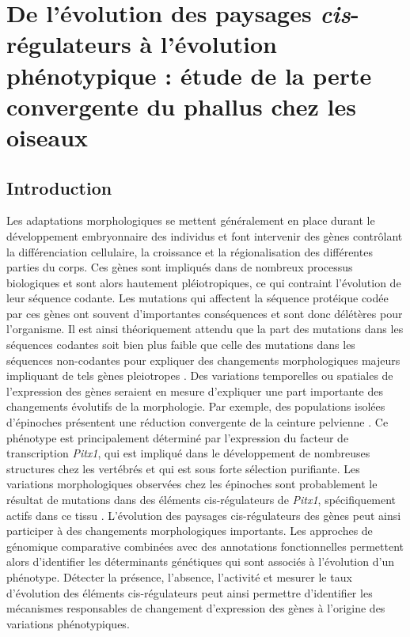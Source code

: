\chapter{De l’évolution des paysages \textit{cis}-régulateurs à l’évolution phénotypique : étude de la perte convergente du phallus chez les oiseaux}
{\hypersetup{linkcolor=GREYDARK}\minitoc}
\label{chap:4-evolpheno}

\section{Introduction}

Les adaptations morphologiques se mettent généralement en place durant le développement embryonnaire des individus et font intervenir des gènes contrôlant la différenciation cellulaire, la croissance et la régionalisation des différentes parties du corps. Ces gènes sont impliqués dans de nombreux processus biologiques et sont alors hautement pléiotropiques, ce qui contraint l’évolution de leur séquence codante. Les mutations qui affectent la séquence protéique codée par ces gènes ont souvent d'importantes conséquences et sont donc délétères pour l’organisme. Il est ainsi théoriquement attendu que la part des mutations dans les séquences codantes soit bien plus faible que celle des mutations dans les séquences non-codantes pour expliquer des changements morphologiques majeurs impliquant de tels gènes \glspl{pleiotrope} \citep{wray_evolutionary_2007, carroll_evo-devo_2008}. Des variations temporelles ou spatiales de l’expression des gènes seraient en mesure d’expliquer une part importante des changements évolutifs de la morphologie. Par exemple, des populations isolées d’épinoches présentent une réduction convergente de la ceinture pelvienne \citep{shapiro_genetic_2004}. Ce phénotype est principalement déterminé par l’expression du facteur de transcription \textit{Pitx1}, qui est impliqué dans le développement de nombreuses structures chez les vertébrés et qui est sous forte sélection purifiante. Les variations morphologiques observées chez les épinoches sont probablement le résultat de mutations dans des éléments \gls{cis}-régulateurs de \textit{Pitx1}, spécifiquement actifs dans ce tissu \citep{chan_adaptive_2010, thompson_novel_2018}. L’évolution des paysages \gls{cis}-régulateurs des gènes peut ainsi participer à des changements morphologiques importants. Les approches de génomique comparative combinées avec des annotations fonctionnelles permettent alors d’identifier les déterminants génétiques qui sont associés à l’évolution d’un phénotype. Détecter la présence, l’absence, l’activité et mesurer le taux d’évolution des éléments \gls{cis}-régulateurs peut ainsi permettre d’identifier les mécanismes responsables de changement d’expression des gènes à l’origine des variations phénotypiques. \\

